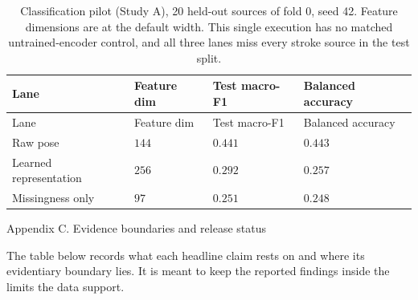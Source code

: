 \documentclass{article}
\begin{document}
\begin{longtable}[]{@{}
  >{\raggedright\arraybackslash}p{}
  >{\raggedleft\arraybackslash}p{}
  >{\raggedleft\arraybackslash}p{}
  >{\raggedleft\arraybackslash}p{}@{}}
\caption{Classification pilot (Study A), 20 held-out sources of fold 0,
seed 42. Feature dimensions are at the default width. This single
execution has no matched untrained-encoder control, and all three lanes
miss every stroke source in the test split.}\tabularnewline
\toprule\noalign{}
\begin{minipage}[b]{\linewidth}\raggedright
Lane
\end{minipage} & \begin{minipage}[b]{\linewidth}\raggedleft
Feature dim
\end{minipage} & \begin{minipage}[b]{\linewidth}\raggedleft
Test macro-F1
\end{minipage} & \begin{minipage}[b]{\linewidth}\raggedleft
Balanced accuracy
\end{minipage} \\
\midrule\noalign{}
\endfirsthead
\toprule\noalign{}
\begin{minipage}[b]{\linewidth}\raggedright
Lane
\end{minipage} & \begin{minipage}[b]{\linewidth}\raggedleft
Feature dim
\end{minipage} & \begin{minipage}[b]{\linewidth}\raggedleft
Test macro-F1
\end{minipage} & \begin{minipage}[b]{\linewidth}\raggedleft
Balanced accuracy
\end{minipage} \\
\midrule\noalign{}
\endhead
\bottomrule\noalign{}
\endlastfoot
Raw pose & \(144\) & \(0.441\) & \(0.443\) \\
Learned representation & \(256\) & \(0.292\) & \(0.257\) \\
Missingness only & \(97\) & \(0.251\) & \(0.248\) \\
\end{longtable}

Appendix C. Evidence boundaries and release status

The table below records what each headline claim rests on and where its
evidentiary boundary lies. It is meant to keep the reported findings
inside the limits the data support.
\end{document}
